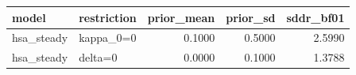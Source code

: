 \begin{tabular}{llrrr}
\toprule
model & restriction & prior\_mean & prior\_sd & sddr\_bf01 \\
\midrule
hsa\_steady & kappa\_0=0 & 0.1000 & 0.5000 & 2.5990 \\
hsa\_steady & delta=0 & 0.0000 & 0.1000 & 1.3788 \\
\bottomrule
\end{tabular}
